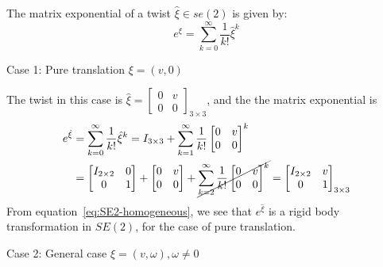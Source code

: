 The matrix exponential of a twist \( \hat{\xi} \in se(2) \) is given by:
\[
    e^{\hat{\xi}} = \sum_{k=0}^{\infty} \frac{1}{k!} \hat{\xi}^k
\]

Case 1: Pure translation \( \xi = (v, 0) \)

The twist in this case is \( \hat{\xi} = \left[ \begin{array}{cc} 0 & v \\ 0 & 0 \end{array} \right]_{3\times 3} \), and the the matrix exponential is
\begin{align*}
    e^{\hat{\xi}}
     & =
    \sum_{k=0}^{\infty} \frac{1}{k!} \hat{\xi}^k
    =
    I_{3\times 3} + \sum_{k=1}^{\infty} \frac{1}{k!}
    \begin{bmatrix}
        0 & v \\
        0 & 0
    \end{bmatrix}
    ^k
    \\ & =
    \begin{bmatrix}
        I_{2\times 2} & 0 \\
        0             & 1
    \end{bmatrix}
    +
    \begin{bmatrix}
        0 & v \\
        0 & 0
    \end{bmatrix}
    +
    \cancel{\sum_{k=2}^{\infty} \frac{1}{k!}
        \begin{bmatrix}
            0 & v \\
            0 & 0
        \end{bmatrix}
        ^k
    }
    =
    \begin{bmatrix}
        I_{2\times 2} & v \\
        0             & 1
    \end{bmatrix}_{3\times 3}
\end{align*}
From equation~\eqref{eq:SE2-homogeneous}, we see that \( e^{\hat{\xi}} \) is a rigid body transformation in \( SE(2) \), for the case of pure translation.

Case 2: General case \( \xi = (v, \omega), \omega \neq 0 \)

